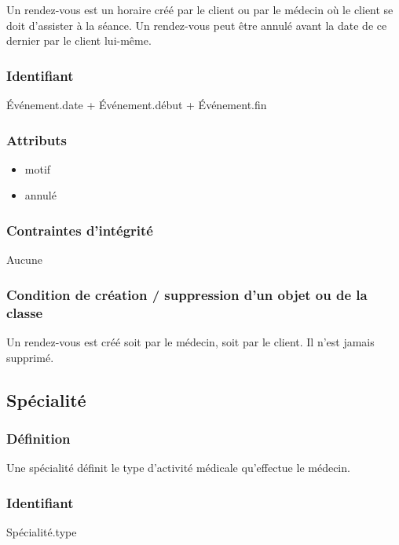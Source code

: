 \documentclass[a4paper, 11pt]{report}
\begin{document}
Un rendez-vous est un horaire créé par le client ou par le médecin où le client se doit 
d'assister à la séance.
Un rendez-vous peut être annulé avant la date de ce dernier par le client lui-même.

\subsubsection{Identifiant}

Événement.date + Événement.début + Événement.fin

\subsubsection{Attributs}

\begin{itemize}
    \item motif
    \item annulé
\end{itemize}

\subsubsection{Contraintes d'intégrité}

Aucune

\subsubsection{Condition de création / suppression d'un objet ou de la classe}

Un rendez-vous est créé soit par le médecin, soit par le client. Il n'est jamais supprimé.

\subsection{Spécialité}

\subsubsection{Définition}

Une spécialité définit le type d'activité médicale qu'effectue le médecin.

\subsubsection{Identifiant}

Spécialité.type
\end{document}
